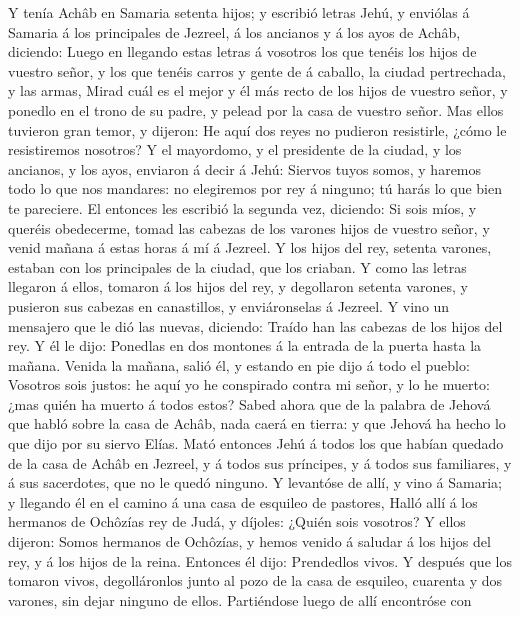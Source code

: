  Y tenía Achâb en Samaria setenta hijos; y escribió letras
Jehú, y enviólas á Samaria á los principales de Jezreel, á los ancianos
y á los ayos de Achâb, diciendo:  Luego en llegando estas
letras á vosotros los que tenéis los hijos de vuestro señor, y los que
tenéis carros y gente de á caballo, la ciudad pertrechada, y las armas,
 Mirad cuál es el mejor y él más recto de los hijos de
vuestro señor, y ponedlo en el trono de su padre, y pelead por la casa
de vuestro señor.  Mas ellos tuvieron gran temor, y dijeron:
He aquí dos reyes no pudieron resistirle, ¿cómo le resistiremos
nosotros?  Y el mayordomo, y el presidente de la ciudad, y
los ancianos, y los ayos, enviaron á decir á Jehú: Siervos tuyos somos,
y haremos todo lo que nos mandares: no elegiremos por rey á ninguno; tú
harás lo que bien te pareciere.  El entonces les escribió la
segunda vez, diciendo: Si sois míos, y queréis obedecerme, tomad las
cabezas de los varones hijos de vuestro señor, y venid mañana á estas
horas á mí á Jezreel. Y los hijos del rey, setenta varones, estaban con
los principales de la ciudad, que los criaban.  Y como las
letras llegaron á ellos, tomaron á los hijos del rey, y degollaron
setenta varones, y pusieron sus cabezas en canastillos, y enviáronselas
á Jezreel.  Y vino un mensajero que le dió las nuevas,
diciendo: Traído han las cabezas de los hijos del rey. Y él le dijo:
Ponedlas en dos montones á la entrada de la puerta hasta la mañana.
 Venida la mañana, salió él, y estando en pie dijo á todo el
pueblo: Vosotros sois justos: he aquí yo he conspirado contra mi señor,
y lo he muerto: ¿mas quién ha muerto á todos estos?  Sabed
ahora que de la palabra de Jehová que habló sobre la casa de Achâb, nada
caerá en tierra: y que Jehová ha hecho lo que dijo por su siervo Elías.
 Mató entonces Jehú á todos los que habían quedado de la
casa de Achâb en Jezreel, y á todos sus príncipes, y á todos sus
familiares, y á sus sacerdotes, que no le quedó ninguno.  Y
levantóse de allí, y vino á Samaria; y llegando él en el camino á una
casa de esquileo de pastores,  Halló allí á los hermanos de
Ochôzías rey de Judá, y díjoles: ¿Quién sois vosotros? Y ellos dijeron:
Somos hermanos de Ochôzías, y hemos venido á saludar á los hijos del
rey, y á los hijos de la reina.  Entonces él dijo:
Prendedlos vivos. Y después que los tomaron vivos, degolláronlos junto
al pozo de la casa de esquileo, cuarenta y dos varones, sin dejar
ninguno de ellos.  Partiéndose luego de allí encontróse con
